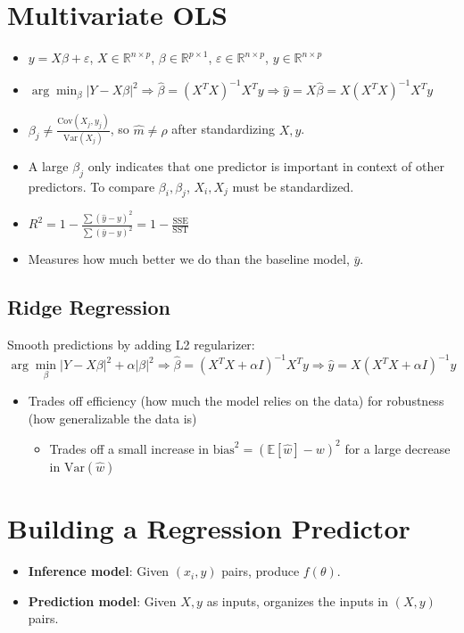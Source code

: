 \documentclass{article}
\begin{document}
\section{Multivariate OLS}
\begin{itemize}
    \item $y = X\beta + \varepsilon$, \quad $X \in \mathbb{R}^{n \times p}$, $\beta \in \mathbb{R}^{p \times 1}$, $\varepsilon \in \mathbb{R}^{n \times p}$, $y \in \mathbb{R}^{n \times p}$
    \item $\arg\min_\beta |Y - X\beta|^2 \Rightarrow \hat{\beta} = (X^TX)^{-1}X^Ty \Rightarrow \hat{y} = X\hat{\beta} = X(X^TX)^{-1}X^Ty$
    \item $\beta_j \neq \frac{\text{Cov}(X_j, y_j)}{\text{Var}(X_j)}$, so $\hat{m} \neq \rho$ after standardizing $X, y$. 
    \item A large $\beta_j$ only indicates that one predictor is important in context of other predictors. To compare $\beta_i, \beta_j$, $X_i, X_j$ must be standardized.
    \item $R^2 = 1 - \frac{\sum(\hat{y} - y)^2}{\sum(\bar{y} - y)^2} = 1 - \frac{\text{SSE}}{\text{SST}}$
    \item Measures how much better we do than the baseline model, $\bar{y}$.
\end{itemize}

\subsection{Ridge Regression}
Smooth predictions by adding L2 regularizer:
\[
    \arg\min_\beta |Y - X\beta|^2 + \alpha|\beta|^2 \Rightarrow \hat{\beta} = (X^TX + \alpha I)^{-1}X^Ty \Rightarrow \hat{y} = X(X^TX + \alpha I)^{-1}y
\]

\begin{itemize}
    \item Trades off efficiency (how much the model relies on the data) for robustness (how generalizable the data is)
        \begin{itemize}
            \item Trades off a small increase in $\text{bias}^2 = (\mathbb{E}[\hat{w}] - w)^2$ for a large decrease in $\text{Var}(\hat{w})$
        \end{itemize}
\end{itemize}

\section{Building a Regression Predictor}
\begin{itemize}
    \item \textbf{Inference model}: Given $(x_i, y)$ pairs, produce $f(\theta)$.
    \item \textbf{Prediction model}: Given $X, y$ as inputs, organizes the inputs in $(X, y)$ pairs.
\end{itemize}
\end{document}
